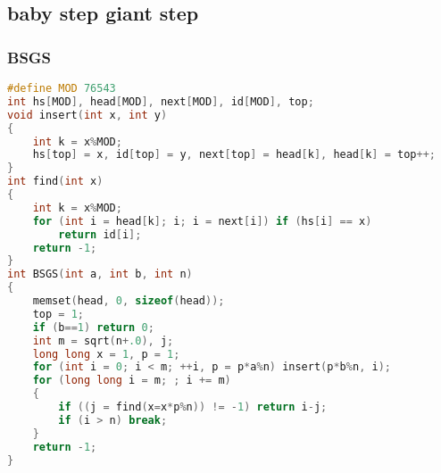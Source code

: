\subsection{baby step giant step}
	\subsubsection{BSGS}
	\begin{lstlisting}[language=c++]
#define MOD 76543
int hs[MOD], head[MOD], next[MOD], id[MOD], top;
void insert(int x, int y)
{
	int k = x%MOD;
	hs[top] = x, id[top] = y, next[top] = head[k], head[k] = top++;
}
int find(int x)
{
	int k = x%MOD;
	for (int i = head[k]; i; i = next[i]) if (hs[i] == x) 
		return id[i];
	return -1;
}
int BSGS(int a, int b, int n)
{
	memset(head, 0, sizeof(head));
	top = 1;
	if (b==1) return 0;
	int m = sqrt(n+.0), j;
	long long x = 1, p = 1;
	for (int i = 0; i < m; ++i, p = p*a%n) insert(p*b%n, i);
	for (long long i = m; ; i += m)
	{
		if ((j = find(x=x*p%n)) != -1) return i-j;
		if (i > n) break;
	}
	return -1;
}
	\end{lstlisting}


